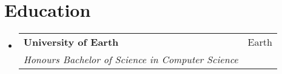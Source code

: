 \documentclass[letterpaper,11pt]{article}
\makeatletter
\newcommand{\resumeSubheading}[4]{
  \vspace{-2pt}\item
    \begin{tabular*}{0.97\textwidth}[t]{l@{\extracolsep{\fill}}r}
      \textbf{#1} & #2 \\
      \textit{\small#3} & \textit{\small #4} \\
    \end{tabular*}\vspace{-7pt}
}
\newcommand{\resumeSubHeadingListStart}{\begin{itemize}[leftmargin=0.15in, label={}]}
\newcommand{\resumeSubHeadingListEnd}{\end{itemize}}
\makeatother
\begin{document}
\section{Education}
  \resumeSubHeadingListStart
    \resumeSubheading
      {University of Earth}{Earth}
      {Honours Bachelor of Science in Computer Science}{}
  \resumeSubHeadingListEnd

\end{document}
